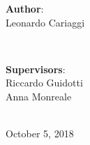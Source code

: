 \documentclass[
    pdftex,
    fontsize=11pt,
    a4paper
   ]{scrbook}
\begin{document}
\begin{titlepage}
\vfill
\begin{minipage}{0.4\textwidth}
\begin{flushleft} \Large

\textbf{Author}:\\
Leonardo Cariaggi %
\end{flushleft}
\end{minipage}
~
\begin{minipage}{0.4\textwidth}
\begin{flushright} \Large
\textbf{Supervisors}: \\
Riccardo Guidotti\\ %
Anna Monreale %
\end{flushright}
\end{minipage}\\[2cm]


{\Large October 5, 2018}\\[2cm] %

\vfill %
\end{titlepage}
\end{document}
